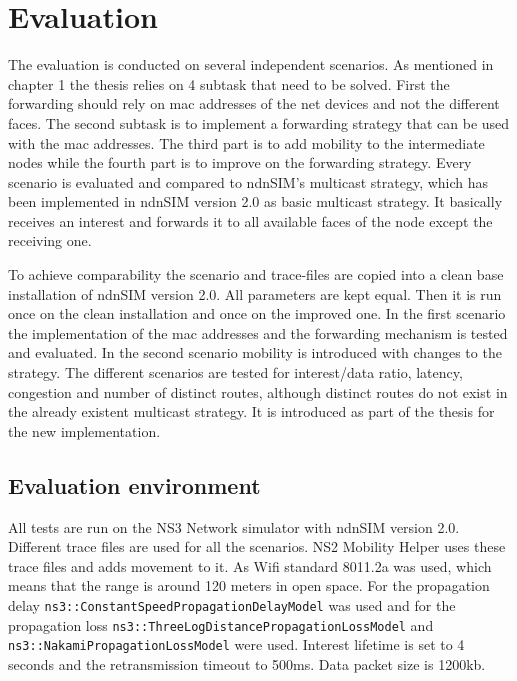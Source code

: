\chapter{Evaluation}

The evaluation is conducted on several independent scenarios. As mentioned in chapter 1 the thesis relies on 4 subtask that need to be solved. First the forwarding should rely on mac addresses of the net devices and not the different faces. The second subtask is to implement a forwarding strategy that can be used with the mac addresses. The third part is to add mobility to the intermediate nodes while the fourth part is to improve on the forwarding strategy. Every scenario is evaluated and compared to ndnSIM's multicast strategy, which has been implemented in ndnSIM version 2.0 as basic multicast strategy. It basically receives an interest and forwards it to all available faces of the node except the receiving one.

To achieve comparability the scenario and trace-files are copied into a clean base installation of ndnSIM version 2.0. All parameters are kept equal. Then it is run once on the clean installation and once on the improved one. In the first scenario the implementation of the mac addresses and the forwarding mechanism is tested and evaluated. In the second scenario mobility is introduced with changes to the strategy. The different scenarios are tested for interest/data ratio, latency, congestion and number of distinct routes, although distinct routes do not exist in the already existent multicast strategy. It is introduced as part of the thesis for the new implementation.

\section{Evaluation environment}

All tests are run on the NS3 Network simulator with ndnSIM version 2.0. Different trace files are used for all the scenarios. NS2 Mobility Helper uses these trace files and adds movement to it. As Wifi standard 8011.2a was used, which means that the range is around 120 meters \cite{wifi80211a} in open space. For the propagation delay \texttt{ns3::ConstantSpeedPropagationDelayModel} was used and for the propagation loss \texttt{ns3::ThreeLogDistancePropagationLossModel} and \texttt{ns3::NakamiPropagationLossModel} were used. Interest lifetime is set to 4 seconds and the retransmission timeout to 500ms. Data packet size is 1200kb.

